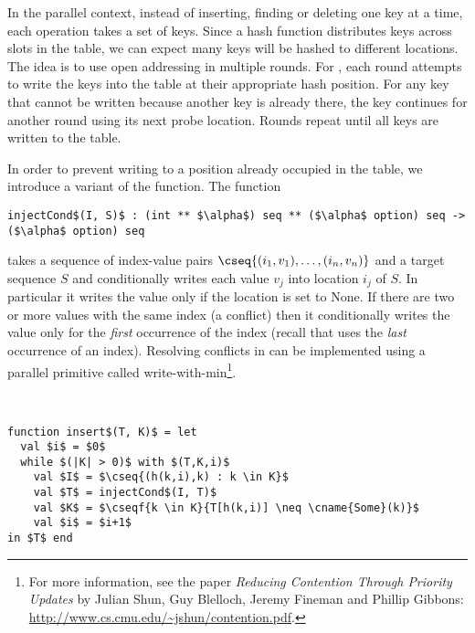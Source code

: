 In the parallel context, instead of inserting, finding or deleting one
key at a time, each operation takes a set of keys.  Since a hash
function distributes keys across slots in the table, we can expect
many keys will be hashed to different locations.  The idea is to use
open addressing in multiple rounds.  For , each round
attempts to write the keys into the table at their appropriate hash
position.  For any key that cannot be written because another key is
already there, the key continues for another round using its next
probe location. Rounds repeat until all keys are written to the table.

In order to prevent writing to a position already occupied in the
table, we introduce a variant of the  function.
The function
\begin{lstlisting}[numbers=none]
injectCond$(I, S)$ : (int ** $\alpha$) seq ** ($\alpha$ option) seq -> ($\alpha$ option) seq
\end{lstlisting}
takes a sequence of index-value pairs
$\cseq{(i_1,v_1),\ldots,(i_n,v_n)}$ and a target sequence $S$ and
conditionally writes each value $v_j$ into location $i_j$ of $S$.  In
particular it writes the value only if the location is set to None. If
there are two or more values with the same index (a conflict) then it
conditionally writes the value only for the \emph{first} occurrence of
the index (recall that  uses the \emph{last} occurrence
of an index).  Resolving conflicts in  can be
implemented using a parallel primitive called
write-with-min\footnote{For more information, see the paper
  \emph{Reducing Contention Through Priority Updates} by Julian Shun,
  Guy Blelloch, Jeremy Fineman and Phillip Gibbons:
  \url{http://www.cs.cmu.edu/~jshun/contention.pdf}.}.


\begin{algorithm}~
\begin{lstlisting}
function insert$(T, K)$ = let
  val $i$ = $0$
  while $(|K| > 0)$ with $(T,K,i)$
    val $I$ = $\cseq{(h(k,i),k) : k \in K}$
    val $T$ = injectCond$(I, T)$
    val $K$ = $\cseqf{k \in K}{T[h(k,i)] \neq \cname{Some}(k)}$
    val $i$ = $i+1$
in $T$ end
\end{lstlisting}
\end{algorithm}

